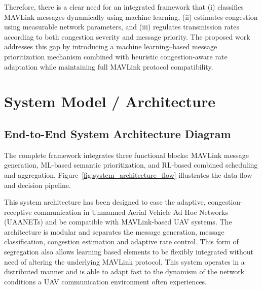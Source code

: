 \documentclass[pdflatex,sn-mathphys-num]{sn-jnl}%
\theoremstyle{thmstyleone}%
\theoremstyle{thmstyletwo}%
\theoremstyle{thmstylethree}%
\begin{document}
Therefore, there is a clear need for an integrated framework that (i) classifies MAVLink messages dynamically using machine learning, (ii) estimates congestion using measurable network parameters, and (iii) regulates transmission rates according to both congestion severity and message priority. The proposed work addresses this gap by introducing a machine learning–based message prioritization mechanism combined with heuristic congestion-aware rate adaptation while maintaining full MAVLink protocol compatibility.

\section{ System Model / Architecture }

\subsection{ End-to-End System Architecture Diagram }

The complete framework integrates three functional blocks: MAVLink message generation, ML-based semantic prioritization, and RL-based combined scheduling and aggregation. Figure~\ref{fig:system_architecture_flow} illustrates the data flow and decision pipeline.



This system architecture has been designed to ease the adaptive, congestion-receptive communication in Unmanned Aerial Vehicle Ad Hoc Networks (UAANETs) and be compatible with MAVLink-based UAV systems.
The architecture is modular and separates the message generation, message classification, congestion estimation and adaptive rate control.
This form of segregation also allows learning based elements to be flexibly integrated without need of altering the underlying MAVLink protocol.
This system operates in a distributed manner and is able to adapt fast to the dynamism of the network conditions a UAV communication environment often experiences.\\
\end{document}
